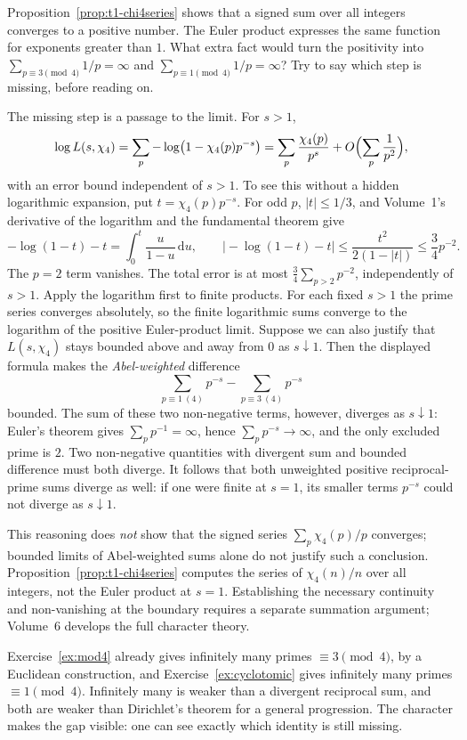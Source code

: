 \begin{think}
Proposition~\ref{prop:t1-chi4series} shows that a signed sum over all integers converges to a positive number. The Euler product expresses the same function for exponents greater than $1$. What extra fact would turn the positivity into $\sum_{p\equiv3\pmod4}1/p=\infty$ and $\sum_{p\equiv1\pmod4}1/p=\infty$? Try to say which step is missing, before reading on.
\end{think}

The missing step is a passage to the limit. For $s>1$,
\[
\log L(s,\chi_4)=\sum_p-\log\bigl(1-\chi_4(p)p^{-s}\bigr)
=\sum_p\frac{\chi_4(p)}{p^s}+O\Bigl(\sum_p\frac1{p^2}\Bigr),
\]
with an error bound independent of $s>1$. To see this without a hidden logarithmic expansion, put $t=\chi_4(p)p^{-s}$. For odd $p$, $|t|\le1/3$, and Volume~1's derivative of the logarithm and the fundamental theorem give
\[
-\log(1-t)-t=\int_0^t\frac{u}{1-u}\,\mathrm du,
\qquad
\bigl|-\log(1-t)-t\bigr|\le\frac{t^2}{2(1-|t|)}\le\frac34p^{-2}.
\]
The $p=2$ term vanishes. The total error is at most $\frac34\sum_{p>2}p^{-2}$, independently of $s>1$. Apply the logarithm first to finite products. For each fixed $s>1$ the prime series converges absolutely, so the finite logarithmic sums converge to the logarithm of the positive Euler-product limit. Suppose we can also justify that $L(s,\chi_4)$ stays bounded above and away from $0$ as $s\downarrow1$. Then the displayed formula makes the \emph{Abel-weighted} difference
\[
\sum_{p\equiv1\ (4)}p^{-s}-\sum_{p\equiv3\ (4)}p^{-s}
\]
bounded. The sum of these two non-negative terms, however, diverges as $s\downarrow1$: Euler's theorem gives $\sum_p p^{-1}=\infty$, hence $\sum_p p^{-s}\to\infty$, and the only excluded prime is $2$. Two non-negative quantities with divergent sum and bounded difference must both diverge. It follows that both unweighted positive reciprocal-prime sums diverge as well: if one were finite at $s=1$, its smaller terms $p^{-s}$ could not diverge as $s\downarrow1$.

This reasoning does \emph{not} show that the signed series $\sum_p\chi_4(p)/p$ converges; bounded limits of Abel-weighted sums alone do not justify such a conclusion. Proposition~\ref{prop:t1-chi4series} computes the series of $\chi_4(n)/n$ over all integers, not the Euler product at $s=1$. Establishing the necessary continuity and non-vanishing at the boundary requires a separate summation argument; Volume~6 develops the full character theory.

Exercise~\ref{ex:mod4} already gives infinitely many primes $\equiv3\pmod4$, by a Euclidean construction, and Exercise~\ref{ex:cyclotomic} gives infinitely many primes $\equiv1\pmod4$. Infinitely many is weaker than a divergent reciprocal sum, and both are weaker than Dirichlet's theorem for a general progression. The character makes the gap visible: one can see exactly which identity is still missing.

